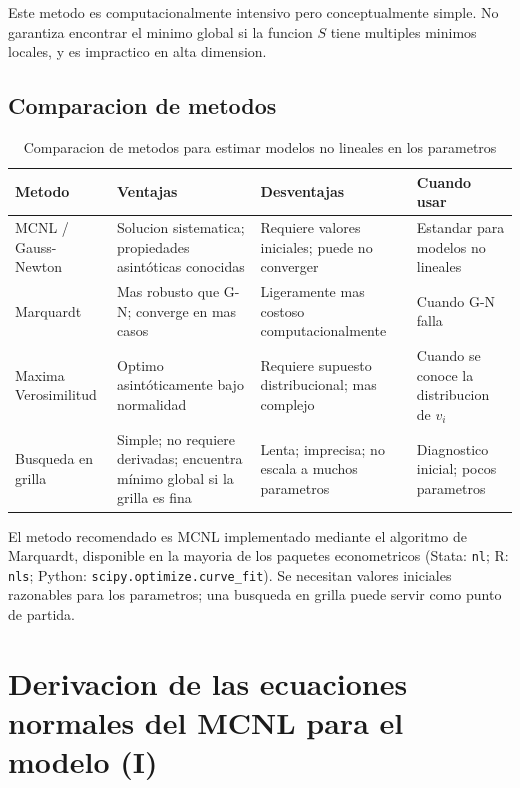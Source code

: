 \documentclass[12pt, letterpaper]{article}
\theoremstyle{remark}
\begin{document}
Este metodo es computacionalmente intensivo pero conceptualmente simple. No
garantiza encontrar el minimo global si la funcion $S$ tiene multiples minimos
locales, y es impractico en alta dimension.

\subsection{Comparacion de metodos}

\begin{table}[ht]
\centering
\caption{Comparacion de metodos para estimar modelos no lineales en los parametros}
\label{tab:metodos}
\small
\begin{tabular}{p{3.2cm} p{3.5cm} p{3.5cm} p{3cm}}
\toprule
\textbf{Metodo} & \textbf{Ventajas} & \textbf{Desventajas} & \textbf{Cuando usar} \\
\midrule
MCNL / Gauss-Newton
  & Solucion sistematica; propiedades asintóticas conocidas
  & Requiere valores iniciales; puede no converger
  & Estandar para modelos no lineales \\[4pt]
Marquardt
  & Mas robusto que G-N; converge en mas casos
  & Ligeramente mas costoso computacionalmente
  & Cuando G-N falla \\[4pt]
Maxima Verosimilitud
  & Optimo asintóticamente bajo normalidad
  & Requiere supuesto distribucional; mas complejo
  & Cuando se conoce la distribucion de $v_i$ \\[4pt]
Busqueda en grilla
  & Simple; no requiere derivadas; encuentra mínimo global si la grilla es fina
  & Lenta; imprecisa; no escala a muchos parametros
  & Diagnostico inicial; pocos parametros \\
\bottomrule
\end{tabular}
\end{table}

\begin{clave}
  El metodo recomendado es MCNL implementado mediante el algoritmo de
  Marquardt, disponible en la mayoria de los paquetes econometricos (Stata:
  \texttt{nl}; R: \texttt{nls}; Python: \texttt{scipy.optimize.curve\_fit}).
  Se necesitan valores iniciales razonables para los parametros; una busqueda
  en grilla puede servir como punto de partida.
\end{clave}

\appendix

\section{Derivacion de las ecuaciones normales del MCNL para el modelo (I)}
\end{document}
